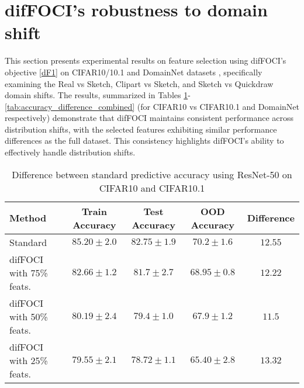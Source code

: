 \newpage

\section{difFOCI's robustness to domain shift}
\label{appx:sec_K}

This section presents experimental results on feature selection using difFOCI's objective \ref{dF1} on CIFAR10/10.1 \citep{recht2018cifar} and DomainNet datasets \citep{peng2019moment}, specifically examining the Real vs Sketch, Clipart vs Sketch, and Sketch vs Quickdraw domain shifts. The results, summarized in Tables \ref{tab:accuracy_difference_cifar10}-\ref{tab:accuracy_difference_combined} (for CIFAR10 vs CIFAR10.1 and DomainNet respectively) demonstrate that difFOCI maintains consistent performance across distribution shifts, with the selected features exhibiting similar performance differences as the full dataset. This consistency highlights difFOCI's ability to effectively handle distribution shifts.

\begin{table}[t]
    \centering
    \begin{tabular}{l|c|c|c|c}
        \hline
        Method & Train Accuracy & Test Accuracy & OOD Accuracy & Difference \\
        \hline
        Standard & $85.20 \pm 2.0$ & $82.75 \pm 1.9$ & $70.2 \pm 1.6$ & $12.55$ \\
        difFOCI with 75\% feats. & $82.66 \pm 1.2$ & $81.7 \pm 2.7$ & $68.95 \pm 0.8$ & $12.22$ \\
        difFOCI with 50\% feats. & $80.19 \pm 2.4$ & $79.4 \pm 1.0$ & $67.9 \pm 1.2$ & $11.5$ \\
        difFOCI with 25\% feats. & $79.55 \pm 2.1$ & $78.72 \pm 1.1$ & $65.40 \pm 2.8$ & $13.32$ \\
        \hline
    \end{tabular}
    \caption{Difference between standard predictive accuracy using ResNet-50 on CIFAR10 and CIFAR10.1}
    \label{tab:accuracy_difference_cifar10}
\end{table}

